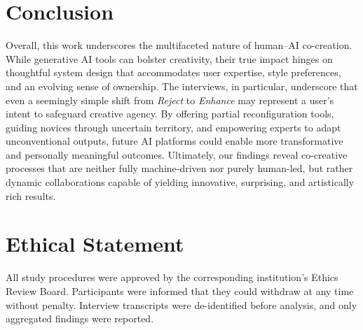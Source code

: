 \documentclass[letterpaper]{article} %
\begin{document}
\section{Conclusion}
Overall, this work underscores the multifaceted nature of human–AI co-creation. While generative AI tools can bolster creativity, their true impact hinges on thoughtful system design that accommodates user expertise, style preferences, and an evolving sense of ownership. The interviews, in particular, underscore that even a seemingly simple shift from \textit{Reject} to \textit{Enhance} may represent a user’s intent to safeguard creative agency. By offering partial reconfiguration tools, guiding novices through uncertain territory, and empowering experts to adapt unconventional outputs, future AI platforms could enable more transformative and personally meaningful outcomes. Ultimately, our findings reveal co-creative processes that are neither fully machine-driven nor purely human-led, but rather dynamic collaborations capable of yielding innovative, surprising, and artistically rich results.

\section*{Ethical Statement}
 All study procedures were approved by the corresponding institution’s Ethics Review Board. Participants were  informed that they could withdraw at any time without penalty. Interview transcripts were de-identified before analysis, and only aggregated findings were reported.



\end{document}
